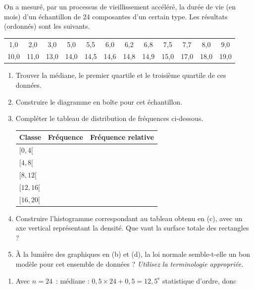 
\begin{exercice}\label{exo:duree}
On a mesuré, par un processus de vieillissement accéléré, la durée de vie (en mois) d'un
échantillon de 24 composantes d'un certain type. Les résultats (ordonnés) sont les suivants.
\begin{center}
\begin{tabular}{*{12}{c}}
1,0 & 2,0 & 3,0 & 5,0 & 5,5 & 6,0 & 6,2 & 6,8 & 7,5 & 7,7 & 8,0 & 9,0\\
10,0 & 11,0 & 13,0 & 14,0 & 14,5 & 14,6 & 14,8 & 14,9 & 15,0 & 17,0 & 18,0 & 19,0\\
\end{tabular}
\end{center}
\begin{enumerate}[label=(\alph*)]
  \item Trouver la médiane, le premier quartile et le troisième quartile de ces données.
  \item Construire le diagramme en boîte pour cet échantillon.
  \item Compléter le tableau de distribution de fréquences ci-dessous.
  \begin{center}
  \begin{tabular}{lcc}
    \toprule
    Classe & Fréquence & Fréquence relative\\
    \midrule
    $[0,4[$ & & \\
    $[4,8[$ & & \\
    $[8,12[$ & & \\
    $[12,16[$ & & \\
    $[16,20[$ & & \\
    \bottomrule
  \end{tabular}
  \end{center}
  \item Construire l'histogramme correspondant au tableau obtenu en (c), avec un axe
  vertical représentant la densité. Que vaut la surface totale des rectangles ?
  \item À la lumière des graphiques en (b) et (d), la loi normale semble-t-elle un bon
  modèle pour cet ensemble de données ? \emph{Utilisez la terminologie appropriée.}
\end{enumerate}
\begin{solution}
\begin{enumerate}[label=(\alph*)]
  \item Avec $n=24$~:
  médiane : $0,5\times 24+0,5=12,5^{\text{e}}$ statistique d'ordre, donc

\end{enumerate}
\end{solution}
\end{exercice}
